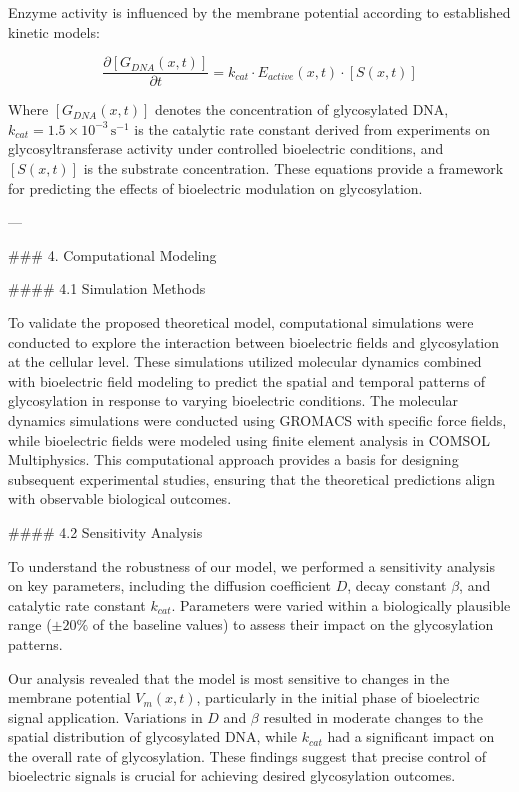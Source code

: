 Enzyme activity is influenced by the membrane potential according to established kinetic models:

\[
\frac{\partial [G_{DNA}(x,t)]}{\partial t} = k_{cat} \cdot E_{active}(x,t) \cdot [S(x,t)]
\]

Where \([G_{DNA}(x,t)]\) denotes the concentration of glycosylated DNA, \(k_{cat} = 1.5 \times 10^{-3} \, \text{s}^{-1}\) is the catalytic rate constant derived from experiments on glycosyltransferase activity under controlled bioelectric conditions, and \([S(x,t)]\) is the substrate concentration. These equations provide a framework for predicting the effects of bioelectric modulation on glycosylation.

---

### 4. Computational Modeling

#### 4.1 Simulation Methods

To validate the proposed theoretical model, computational simulations were conducted to explore the interaction between bioelectric fields and glycosylation at the cellular level. These simulations utilized molecular dynamics combined with bioelectric field modeling to predict the spatial and temporal patterns of glycosylation in response to varying bioelectric conditions. The molecular dynamics simulations were conducted using GROMACS with specific force fields, while bioelectric fields were modeled using finite element analysis in COMSOL Multiphysics. This computational approach provides a basis for designing subsequent experimental studies, ensuring that the theoretical predictions align with observable biological outcomes.

#### 4.2 Sensitivity Analysis

To understand the robustness of our model, we performed a sensitivity analysis on key parameters, including the diffusion coefficient \(D\), decay constant \(\beta\), and catalytic rate constant \(k_{cat}\). Parameters were varied within a biologically plausible range (\(\pm 20\%\) of the baseline values) to assess their impact on the glycosylation patterns.

Our analysis revealed that the model is most sensitive to changes in the membrane potential \(V_m(x,t)\), particularly in the initial phase of bioelectric signal application. Variations in \(D\) and \(\beta\) resulted in moderate changes to the spatial distribution of glycosylated DNA, while \(k_{cat}\) had a significant impact on the overall rate of glycosylation. These findings suggest that precise control of bioelectric signals is crucial for achieving desired glycosylation outcomes.

